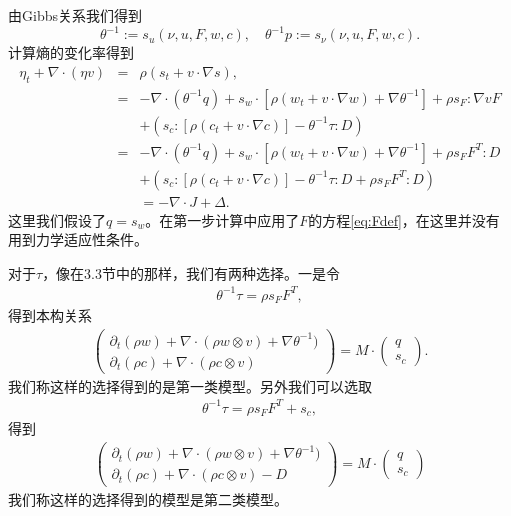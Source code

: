 由Gibbs关系我们得到
$$\theta^{-1}:=s_{u} (\nu,u,F, w,c), \quad \theta^{-1} p := s_\nu (\nu,u,F,w,c).$$
计算熵的变化率得到
\begin{eqnarray*}
		\eta_t + \nabla \cdot (\eta v) &=& \rho (s_t + v \cdot \nabla s), \\
		&=& -\nabla \cdot (\theta^{-1} q) + s_w \cdot [\rho (w_t + v \cdot \nabla w) + \nabla \theta^{-1}] + \rho s_F : \nabla v F  \\
		&& + (s_c:[\rho (c_t + v \cdot \nabla c)] - \theta^{-1} \tau : D) \\
		&=& -\nabla \cdot (\theta^{-1} q) + s_w \cdot [\rho (w_t + v \cdot \nabla w)+\nabla \theta^{-1}] + \rho s_F F^T : D  \\
		&& + (s_c:[\rho (c_t + v \cdot \nabla c)] - \theta^{-1} \tau : D + \rho s_F F^T : D)  \\
		&& = -\nabla \cdot J + \Delta.
\end{eqnarray*}
这里我们假设了$q=s_w$。在第一步计算中应用了$F$的方程\eqref{eq:Fdef}，在这里并没有用到力学适应性条件。

对于$\tau$，像在3.3节中的那样，我们有两种选择。一是令
\begin{eqnarray*}
\theta^{-1} \tau = \rho s_F F^T ,
\end{eqnarray*}
得到本构关系
\begin{eqnarray}\label{eq:finite1}
\left( \begin{array}{c} \partial_t (\rho w) + \nabla \cdot (\rho w \otimes v) + \nabla \theta^{-1}) \\
	\partial_t (\rho c) + \nabla \cdot (\rho c \otimes v) \end{array} \right)
=
M \cdot \left( \begin{array}{c} q \\ s_c \end{array} \right).
\end{eqnarray}
我们称这样的选择得到的是第一类模型。另外我们可以选取
\begin{eqnarray*}
	\theta^{-1} \tau = \rho s_F F^T + s_c,
\end{eqnarray*}
得到
\begin{eqnarray}\label{eq:finite2}
\left( \begin{array}{c} \partial_t (\rho w) + \nabla \cdot (\rho w \otimes v) + \nabla \theta^{-1}) \\
	\partial_t (\rho c) + \nabla \cdot (\rho c \otimes v) - D \end{array} \right)
=
M \cdot \left( \begin{array}{c} q \\ s_c  \end{array} \right)
\end{eqnarray}
我们称这样的选择得到的模型是第二类模型。

